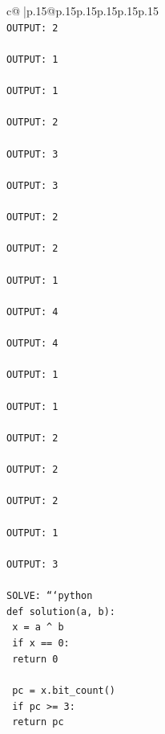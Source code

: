 \documentclass{article}
\begin{document}
{\begin{supertabular}{c@{$\;$}|p{.15\linewidth}@{}p{.15\linewidth}p{.15\linewidth}p{.15\linewidth}p{.15\linewidth}p{.15\linewidth}}
{{{\\ 
\texttt{OUTPUT: 2} \\
\\ 
\texttt{OUTPUT: 1} \\
\\ 
\texttt{OUTPUT: 1} \\
\\ 
\texttt{OUTPUT: 2} \\
\\ 
\texttt{OUTPUT: 3} \\
\\ 
\texttt{OUTPUT: 3} \\
\\ 
\texttt{OUTPUT: 2} \\
\\ 
\texttt{OUTPUT: 2} \\
\\ 
\texttt{OUTPUT: 1} \\
\\ 
\texttt{OUTPUT: 4} \\
\\ 
\texttt{OUTPUT: 4} \\
\\ 
\texttt{OUTPUT: 1} \\
\\ 
\texttt{OUTPUT: 1} \\
\\ 
\texttt{OUTPUT: 2} \\
\\ 
\texttt{OUTPUT: 2} \\
\\ 
\texttt{OUTPUT: 2} \\
\\ 
\texttt{OUTPUT: 1} \\
\\ 
\texttt{OUTPUT: 3} \\
\\ 
\texttt{SOLVE: ```python} \\
\texttt{def solution(a, b):} \\
\texttt{    x = a \^{} b} \\
\texttt{    if x == 0:} \\
\texttt{        return 0} \\
\\ 
\texttt{    pc = x.bit\_count()} \\
\texttt{    if pc >= 3:} \\
\texttt{        return pc} \\
\\ 
}}}
\end{supertabular}}
\end{document}

